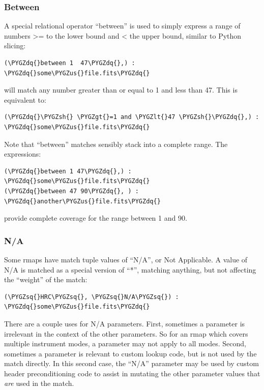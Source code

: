 \documentclass[letterpaper,10pt,english]{sphinxmanual}
\def\PYGZus{\char`\_}
\def\PYGZlt{\char`\<}
\def\PYGZgt{\char`\>}
\def\PYGZsh{\char`\#}
\def\PYGZsq{\char`\'}
\def\PYGZdq{\char`\"}
\begin{document}
\subsubsection{Between}
\label{rmap_syntax:between}
A special relational operator ``between'' is used to simply express a range
of numbers \textgreater{}= to the lower bound and \textless{} the upper bound,  similar to Python
slicing:

\begin{Verbatim}[commandchars=\\\{\}]
(\PYGZdq{}between 1  47\PYGZdq{},) : \PYGZdq{}some\PYGZus{}file.fits\PYGZdq{}
\end{Verbatim}

will match any number greater than or equal to 1 and less than 47.   This is
equivalent to:

\begin{Verbatim}[commandchars=\\\{\}]
(\PYGZdq{}\PYGZsh{} \PYGZgt{}=1 and \PYGZlt{}47 \PYGZsh{}\PYGZdq{},) : \PYGZdq{}some\PYGZus{}file.fits\PYGZdq{}
\end{Verbatim}

Note that ``between'' matches sensibly stack into a complete range.  The expressions:

\begin{Verbatim}[commandchars=\\\{\}]
(\PYGZdq{}between 1 47\PYGZdq{},) : \PYGZdq{}some\PYGZus{}file.fits\PYGZdq{}
(\PYGZdq{}between 47 90\PYGZdq{}, ) : \PYGZdq{}another\PYGZus{}file.fits\PYGZdq{}
\end{Verbatim}

provide complete coverage for the range between 1 and 90.


\subsubsection{N/A}
\label{rmap_syntax:n-a}
Some rmaps have match tuple values of ``N/A'',  or Not Applicable.
A value of N/A is matched as a special version of ``*'', matching anything,  but
not affecting the ``weight'' of the match:

\begin{Verbatim}[commandchars=\\\{\}]
(\PYGZsq{}HRC\PYGZsq{}, \PYGZsq{}N/A\PYGZsq{}) :  \PYGZdq{}some\PYGZus{}file.fits\PYGZdq{}
\end{Verbatim}

There are a couple uses for N/A parameters.    First,  sometimes a parameter is
irrelevant in the context of the other parameters.   So for an rmap which covers
multiple instrument modes,  a parameter may not apply to all modes. Second,
sometimes a parameter is relevant to custom lookup code,  but is not used by the
match directly.  In this second case,   the ``N/A'' parameter may be used by custom
header preconditioning code to assist in mutating the other parameter values
that \emph{are} used in the match.
\end{document}
